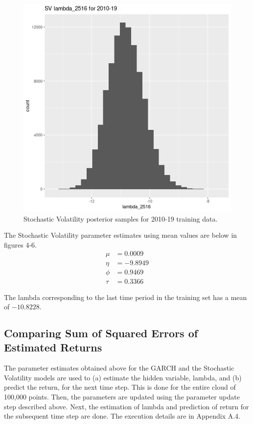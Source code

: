 \documentclass[12pt,letterpaper,reqno,fleqn]{article}
\begin{document}
\begin{figure}
\includegraphics[scale = .4]{svlT1019}
\caption{Stochastic Volatility posterior samples for 2010-19 training data.}
\end{figure}

The Stochastic Volatility parameter estimates using mean values are below in figures 4-6.
\begin{align*}
\mu &= 0.0009 \\
\eta &= -9.8949 \\
\phi &= 0.9469 \\
\tau &= 0.3366
\end{align*}

The lambda corresponding to the last time period in the training set has a mean of $-10.8228$.

\subsection{Comparing Sum of Squared Errors of Estimated Returns}
The parameter estimates obtained above for the GARCH and the Stochastic Volatility models are used to (a) estimate the hidden variable, lambda, and (b) predict the return, for the next time step. This is done for the entire cloud of 100,000 points. Then, the parameters are updated using the parameter update step described above. Next, the estimation of lambda and prediction of return for the subsequent time step are done. The execution details are in Appendix A.4.
\end{document}
